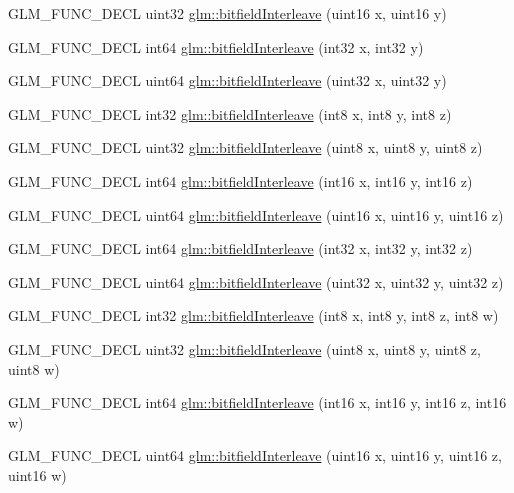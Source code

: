 \begin{DoxyCompactItemize}
\item 
G\-L\-M\-\_\-\-F\-U\-N\-C\-\_\-\-D\-E\-C\-L uint32 \hyperlink{group__gtc__bitfield_ga19ef8360379483e3ee245e89cb62ff93}{glm\-::bitfield\-Interleave} (uint16 x, uint16 y)
\item 
G\-L\-M\-\_\-\-F\-U\-N\-C\-\_\-\-D\-E\-C\-L int64 \hyperlink{group__gtc__bitfield_ga0de51d5985e6a703f305a5a61479babd}{glm\-::bitfield\-Interleave} (int32 x, int32 y)
\item 
G\-L\-M\-\_\-\-F\-U\-N\-C\-\_\-\-D\-E\-C\-L uint64 \hyperlink{group__gtc__bitfield_ga2bc87fd66f6f8471c1a46888360cef12}{glm\-::bitfield\-Interleave} (uint32 x, uint32 y)
\item 
G\-L\-M\-\_\-\-F\-U\-N\-C\-\_\-\-D\-E\-C\-L int32 \hyperlink{group__gtc__bitfield_ga6dee2ce1c45805063bb7fc5f6fd8f5ca}{glm\-::bitfield\-Interleave} (int8 x, int8 y, int8 z)
\item 
G\-L\-M\-\_\-\-F\-U\-N\-C\-\_\-\-D\-E\-C\-L uint32 \hyperlink{group__gtc__bitfield_gab9d593a2e916beb8f8137a0dbeae3afe}{glm\-::bitfield\-Interleave} (uint8 x, uint8 y, uint8 z)
\item 
G\-L\-M\-\_\-\-F\-U\-N\-C\-\_\-\-D\-E\-C\-L int64 \hyperlink{group__gtc__bitfield_gaf898f842ac089fcc8d6201c32702584a}{glm\-::bitfield\-Interleave} (int16 x, int16 y, int16 z)
\item 
G\-L\-M\-\_\-\-F\-U\-N\-C\-\_\-\-D\-E\-C\-L uint64 \hyperlink{group__gtc__bitfield_ga3c170e2ec54f2faab5e1c5bb693d718d}{glm\-::bitfield\-Interleave} (uint16 x, uint16 y, uint16 z)
\item 
G\-L\-M\-\_\-\-F\-U\-N\-C\-\_\-\-D\-E\-C\-L int64 \hyperlink{group__gtc__bitfield_ga64e2d84f6560af3cc639644b1e628c42}{glm\-::bitfield\-Interleave} (int32 x, int32 y, int32 z)
\item 
G\-L\-M\-\_\-\-F\-U\-N\-C\-\_\-\-D\-E\-C\-L uint64 \hyperlink{group__gtc__bitfield_ga7c10eb37f608365cfaef5ca2c476e1ce}{glm\-::bitfield\-Interleave} (uint32 x, uint32 y, uint32 z)
\item 
G\-L\-M\-\_\-\-F\-U\-N\-C\-\_\-\-D\-E\-C\-L int32 \hyperlink{group__gtc__bitfield_ga7da84ecc2b3a46c9c08a9f40012359cf}{glm\-::bitfield\-Interleave} (int8 x, int8 y, int8 z, int8 w)
\item 
G\-L\-M\-\_\-\-F\-U\-N\-C\-\_\-\-D\-E\-C\-L uint32 \hyperlink{group__gtc__bitfield_ga447c0bbed9d60c14578626d8f03f3755}{glm\-::bitfield\-Interleave} (uint8 x, uint8 y, uint8 z, uint8 w)
\item 
G\-L\-M\-\_\-\-F\-U\-N\-C\-\_\-\-D\-E\-C\-L int64 \hyperlink{group__gtc__bitfield_ga09ee0be0fac790a1607a711e597dd9bf}{glm\-::bitfield\-Interleave} (int16 x, int16 y, int16 z, int16 w)
\item 
G\-L\-M\-\_\-\-F\-U\-N\-C\-\_\-\-D\-E\-C\-L uint64 \hyperlink{group__gtc__bitfield_gac8a926a7bfd9b23c22a4f685193fbfe1}{glm\-::bitfield\-Interleave} (uint16 x, uint16 y, uint16 z, uint16 w)
\end{DoxyCompactItemize}


